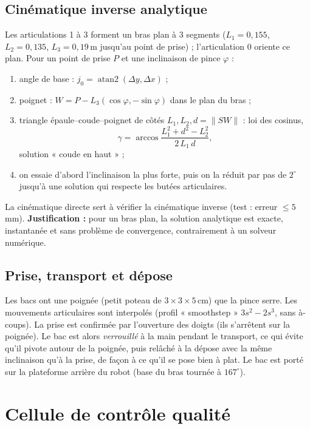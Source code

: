 \documentclass[11pt,a4paper]{article}
\begin{document}
\subsection{Cinématique inverse analytique}
Les articulations 1 à 3 forment un bras plan à 3 segments ($L_1 = 0{,}155$, $L_2 = 0{,}135$,
$L_3 = 0{,}19$\,m jusqu'au point de prise) ; l'articulation 0 oriente ce plan. Pour un point de
prise $P$ et une inclinaison de pince $\varphi$ :
\begin{enumerate}
  \item angle de base : $j_0 = \operatorname{atan2}(\Delta y, \Delta x)$ ;
  \item poignet : $W = P - L_3(\cos\varphi, -\sin\varphi)$ dans le plan du bras ;
  \item triangle épaule--coude--poignet de côtés $L_1, L_2, d = \lVert SW\rVert$ : loi des cosinus,
        \begin{equation}
           \gamma = \arccos\frac{L_1^2 + d^2 - L_2^2}{2\,L_1\,d},
        \end{equation}
        solution « coude en haut » ;
  \item on essaie d'abord l'inclinaison la plus forte, puis on la réduit par pas de $2^\circ$
        jusqu'à une solution qui respecte les butées articulaires.
\end{enumerate}
La cinématique directe sert à vérifier la cinématique inverse (test : erreur $\leq 5$\,mm).
\textbf{Justification :} pour un bras plan, la solution analytique est exacte, instantanée et sans
problème de convergence, contrairement à un solveur numérique.

\subsection{Prise, transport et dépose}
Les bacs ont une poignée (petit poteau de $3\times3\times5$\,cm) que la pince serre. Les
mouvements articulaires sont interpolés (profil « smoothstep » $3s^2 - 2s^3$, sans à-coups). La
prise est confirmée par l'ouverture des doigts (ils s'arrêtent sur la poignée). Le bac est alors
\emph{verrouillé} à la main pendant le transport, ce qui évite qu'il pivote autour de la poignée,
puis relâché à la dépose avec la même inclinaison qu'à la prise, de façon à ce qu'il se pose bien à
plat. Le bac est porté sur la plateforme arrière du robot (base du bras tournée à $167^\circ$).

\section{Cellule de contrôle qualité}
\end{document}
